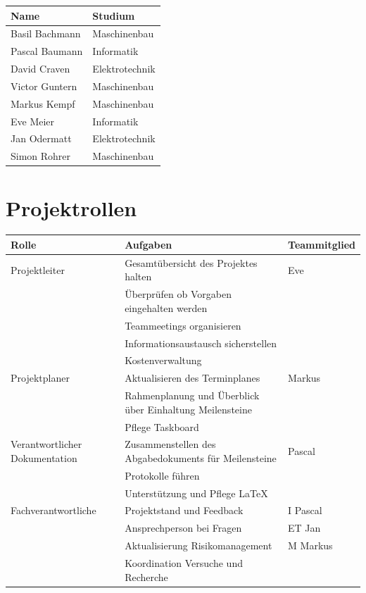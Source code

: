 \documentclass[a4paper]{report}
\begin{document}
\begin{tabular}{|p{}|p{}|}
	\hline
	\textbf{Name} & \textbf{Studium} \\
	\hline
	Basil Bachmann & Maschinenbau \\
	\hline
	Pascal Baumann & Informatik \\
	\hline
	David Craven & Elektrotechnik \\
	\hline
	Victor Guntern & Maschinenbau \\
	\hline
	Markus Kempf & Maschinenbau \\
	\hline
	Eve Meier & Informatik \\
	\hline
	Jan Odermatt & Elektrotechnik \\
	\hline
	Simon Rohrer & Maschinenbau \\
	\hline
\end{tabular}

\section{Projektrollen}

\begin{tabular}{|p{}|p{}|p{}|}
	\hline
	\textbf{Rolle} & \textbf{Aufgaben} & \textbf{Teammitglied} \\
	\hline
	Projektleiter & Gesamtübersicht des Projektes halten  & Eve \\
	& Überprüfen ob Vorgaben eingehalten werden & \\
	& Teammeetings organisieren & \\
	& Informationsaustausch sicherstellen & \\
	& Kostenverwaltung & \\
	\hline
	Projektplaner & Aktualisieren des Terminplanes & Markus\\
	& Rahmenplanung und Überblick über Einhaltung Meilensteine& \\
	& Pflege Taskboard & \\
	\hline
	Verantwortlicher Dokumentation& Zusammenstellen des Abgabedokuments für Meilensteine & Pascal \\
	& Protokolle führen & \\
	& Unterstützung und Pflege LaTeX &  \\
	\hline
	Fachverantwortliche & Projektstand und Feedback & I Pascal \\
	& Ansprechperson bei Fragen & ET Jan\\
	& Aktualisierung Risikomanagement & M Markus\\
	& Koordination Versuche und Recherche & \\
	\hline
\end{tabular}
\end{document}
